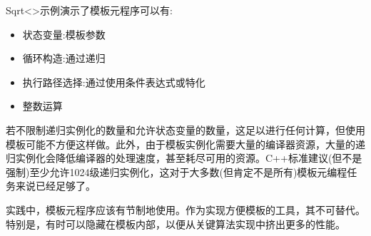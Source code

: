 Sqrt<>示例演示了模板元程序可以有:

\begin{itemize}
\item 
状态变量:模板参数

\item 
循环构造:通过递归

\item 
执行路径选择:通过使用条件表达式或特化

\item 
整数运算
\end{itemize}

若不限制递归实例化的数量和允许状态变量的数量，这足以进行任何计算，但使用模板可能不方便这样做。此外，由于模板实例化需要大量的编译器资源，大量的递归实例化会降低编译器的处理速度，甚至耗尽可用的资源。C++标准建议(但不是强制)至少允许1024级递归实例化，这对于大多数(但肯定不是所有)模板元编程任务来说已经足够了。

实践中，模板元程序应该有节制地使用。作为实现方便模板的工具，其不可替代。特别是，有时可以隐藏在模板内部，以便从关键算法实现中挤出更多的性能。














































